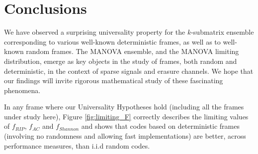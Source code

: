 \documentclass[a4paper,12pt]{article}
\newcommand{\TODO}[1]{ {\tt \color{red} [TODO:#1] } }
\begin{document}
%
%
%
%

\section*{Conclusions}

We have observed a surprising universality property for the $k$-submatrix
ensemble corresponding to various well-known deterministic frames, as well as to
well-known random frames. The MANOVA ensemble, and the MANOVA limiting
distribution, emerge as key objects in the study of frames, both random and
deterministic, in the context of sparse signals and erasure channels. 
We hope that our findings will invite rigorous mathematical study of these 
 fascinating phenomena.

	In any frame where our Universality Hypotheses hold
	(including all the frames under study here),
	Figure \ref{fig:limiting_F} correctly
describes the limiting values of $f_{RIP}$, $f_{AC}$ and $f_{Shannon}$ and shows
that codes based on deterministic frames (involving no randomness and allowing
fast implementations) are better, across performance measures,
than i.i.d random codes. 
\end{document}
